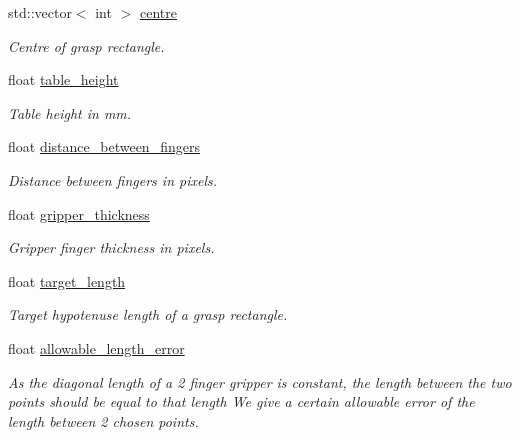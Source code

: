 \begin{DoxyCompactItemize}
\mbox{\label{classTwoFinger_a2a3e8cfa8504784fcfdcf782deeb6864}} 
std\+::vector$<$ int $>$ \hyperlink{classTwoFinger_a2a3e8cfa8504784fcfdcf782deeb6864}{centre}
\begin{DoxyCompactList}\small\item\em Centre of grasp rectangle. \end{DoxyCompactList}\item 
\mbox{\label{classTwoFinger_a3057c3696a07f03a5a95ecc2abdf16da}} 
float \hyperlink{classTwoFinger_a3057c3696a07f03a5a95ecc2abdf16da}{table\+\_\+height}
\begin{DoxyCompactList}\small\item\em Table height in mm. \end{DoxyCompactList}\item 
\mbox{\label{classTwoFinger_afb0ad9bb2961d227461190e499aeb16e}} 
float \hyperlink{classTwoFinger_afb0ad9bb2961d227461190e499aeb16e}{distance\+\_\+between\+\_\+fingers}
\begin{DoxyCompactList}\small\item\em Distance between fingers in pixels. \end{DoxyCompactList}\item 
\mbox{\label{classTwoFinger_a0f27dc02232404233f2ae78846d063aa}} 
float \hyperlink{classTwoFinger_a0f27dc02232404233f2ae78846d063aa}{gripper\+\_\+thickness}
\begin{DoxyCompactList}\small\item\em Gripper finger thickness in pixels. \end{DoxyCompactList}\item 
\mbox{\label{classTwoFinger_a476c6f304358edffd0c3e5fec5a15cf3}} 
float \hyperlink{classTwoFinger_a476c6f304358edffd0c3e5fec5a15cf3}{target\+\_\+length}
\begin{DoxyCompactList}\small\item\em Target hypotenuse length of a grasp rectangle. \end{DoxyCompactList}\item 
float \hyperlink{classTwoFinger_a180e995cc0516a1664f88e9067ff0ae0}{allowable\+\_\+length\+\_\+error}
\begin{DoxyCompactList}\small\item\em As the diagonal length of a 2 finger gripper is constant, the length between the two points should be equal to that length We give a certain allowable error of the length between 2 chosen points. \end{DoxyCompactList}\item 

\end{DoxyCompactItemize}
